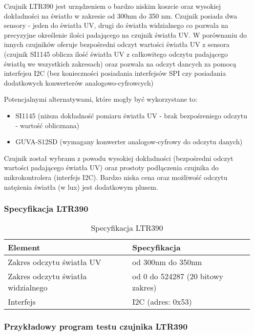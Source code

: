 \documentclass[12pt,a4paper]{article}
\begin{document}
Czujnik LTR390 jest urządzeniem o bardzo niskim koszcie oraz wysokiej dokładności na światło w zakresie od 300nm do 350 nm. Czujnik posiada dwa sensory - jeden do światła UV, drugi do światła widzialnego 
co pozwala na precyzyjne określenie ilości padającego na czujnik światła UV. W porównaniu do innych czujników oferuje bezpośredni odczyt wartości światła UV z sensora (czujnik SI1145 oblicza ilość światła UV z całkowitego odczytu padającego światłą we wszystkich zakresach) 
oraz pozwala na odczyt dancych za pomocą interfejsu I2C (bez konieczności posiadania interfejsów SPI czy posiadania dodatkowych konwerterów analogowo-cyfrowcych) 

Potencjalnymi alternatywami, które mogły być wykorzystane to:
\begin{itemize}
    \item SI1145 (niższa dokładność pomiaru światła UV - brak bezpośreniego odczytu - wartość oblicznana)
    \item GUVA-S12SD (wymagany konwerter analogow-cyfrowy do odczytu danych)
\end{itemize}

Czujnik został wybranu z powodu wysokiej dokładności (bezpośredni odczyt wartości padającego światła UV) oraz prostoty podłączenia czujnika do mikrokontrolera (interfejs I2C). 
Bardzo niska cena oraz możliwość odczytu natężenia światła (w lux) jest dodatkowym plusem.

\subsubsection{Specyfikacja LTR390}

\begin{table}[H]
    \centering
    \begin{tabular}{|l|l|}
        \hline
        Element & Specyfikacja \\
        \hline
        Zakres odczytu światła UV & od 300nm do 350nm \\
        \hline
        Zakres odczytu światła widzialnego & od 0 do 524287 (20 bitowy zakres) \\
        \hline
        Interfejs & I2C (adres: 0x53) \\
        \hline
    \end{tabular}
    \caption{Specyfikacja LTR390}
    \label{ltr390-spec}
\end{table}

\subsubsection{Przykładowy program testu czujnika LTR390}
\end{document}
